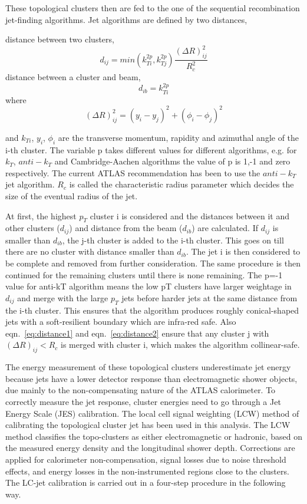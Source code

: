 These topological clusters then are fed to the one of the sequential recombination jet-finding algorithms.  Jet algorithms are defined by two distances,

distance between two clusters, 
\begin{equation} \label{eq:distance1}
d_{ij} = min (k^{2p}_{Ti}, k^{2p}_{Tj}) \frac{(\Delta R)^{2}_{ij}}{R^{2}_{c}}
\end{equation}
distance between a cluster and beam, 
\begin{equation} \label{eq:distance2}
d_{ib} = k^{2p}_{Ti}
\end{equation} 
where 
\begin{equation*}
(\Delta R)^{2}_{ij} = (y_{i}-y_{j})^{2} + (\phi_{i}-\phi_{j})^{2}
\end{equation*}

and $k_{Ti}$, $y_{i}$, $\phi_{i}$ are the transverse momentum, rapidity and azimuthal angle of the i-th cluster. The variable p takes different values for different algorithms, e.g. for $k_{T}$, $anti-k_{T}$ and Cambridge-Aachen algorithms the value of p is 1,-1 and zero respectively. The current ATLAS recommendation has been to use the $anti-k_{T}$ jet algorithm. $R_{c}$ is called the characteristic radius parameter which decides the size of the eventual radius of the jet.

At first, the highest $p_{T}$ cluster i is considered and the distances between it and other clusters ($d_{ij}$) and distance from the beam ($d_{ib}$) are calculated. If $d_{ij}$ is smaller than $d_{ib}$, the j-th cluster is added to the i-th cluster. This goes on till there are no cluster with distance smaller than $d_{ib}$. The jet i is then considered to be complete and removed from further consideration. The same procedure is then continued for the remaining clusters until there is none remaining.
The p=-1 value for anti-kT algorithm means the low pT clusters have larger weightage in $d_{ij}$ and merge with the large $p_{T}$ jets before harder jets at the same distance from the i-th cluster. This ensures that the algorithm produces roughly conical-shaped jets with a soft-resilient boundary which are infra-red safe. Also eqn.~\ref{eq:distance1} and eqn.~\ref{eq:distance2} ensure that any cluster j with $(\Delta R)_{ij} < R_{c} $ is merged with cluster i, which makes the algorithm collinear-safe.

The energy measurement of these topological clusters underestimate jet energy because jets have a lower detector response than electromagnetic shower objects, due mainly to the non-compensating nature of the ATLAS calorimeter. To correctly measure the jet response, cluster energies need to go through a Jet Energy Scale (JES) calibration. 
The local cell signal weighting (LCW) method of calibrating the topological cluster jet has been used in this analysis. The LCW method classifies the topo-clusters as either electromagnetic or hadronic, based on the measured energy density and the longitudinal shower depth. Corrections are applied for calorimeter non-compensation, signal losses due to noise threshold effects, and energy losses in the non-instrumented regions close to the clusters. The LC-jet calibration is carried out in a four-step procedure in the following way.

